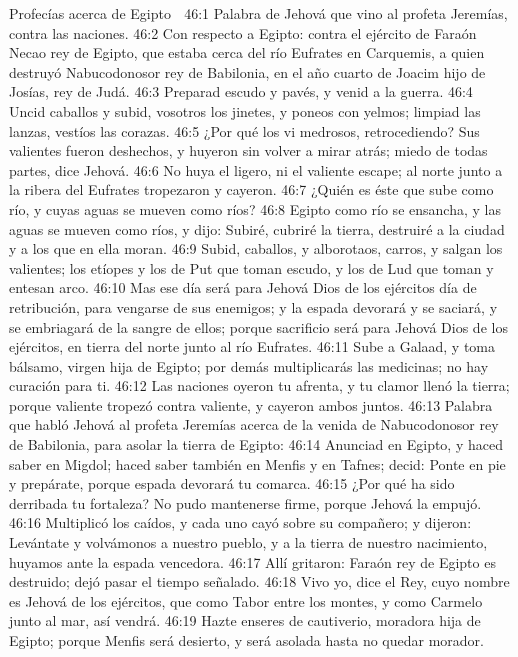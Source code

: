 Profecías acerca de Egipto 

46:1 Palabra de Jehová que vino al profeta Jeremías, contra las naciones.  
46:2 Con respecto a Egipto: contra el ejército de Faraón Necao rey de Egipto, que estaba cerca del río Eufrates en Carquemis, a quien destruyó Nabucodonosor rey de Babilonia, en el año cuarto de Joacim hijo de Josías, rey de Judá.  
46:3 Preparad escudo y pavés, y venid a la guerra.  
46:4 Uncid caballos y subid, vosotros los jinetes, y poneos con yelmos; limpiad las lanzas, vestíos las corazas.  
46:5 ¿Por qué los vi medrosos, retrocediendo? Sus valientes fueron deshechos, y huyeron sin volver a mirar atrás; miedo de todas partes, dice Jehová.  
46:6 No huya el ligero, ni el valiente escape; al norte junto a la ribera del Eufrates tropezaron y cayeron.  
46:7 ¿Quién es éste que sube como río, y cuyas aguas se mueven como ríos?  
46:8 Egipto como río se ensancha, y las aguas se mueven como ríos, y dijo: Subiré, cubriré la tierra, destruiré a la ciudad y a los que en ella moran.  
46:9 Subid, caballos, y alborotaos, carros, y salgan los valientes; los etíopes y los de Put que toman escudo, y los de Lud que toman y entesan arco.  
46:10 Mas ese día será para Jehová Dios de los ejércitos día de retribución, para vengarse de sus enemigos; y la espada devorará y se saciará, y se embriagará de la sangre de ellos; porque sacrificio será para Jehová Dios de los ejércitos, en tierra del norte junto al río Eufrates.  
46:11 Sube a Galaad, y toma bálsamo, virgen hija de Egipto; por demás multiplicarás las medicinas; no hay curación para ti.  
46:12 Las naciones oyeron tu afrenta, y tu clamor llenó la tierra; porque valiente tropezó contra valiente, y cayeron ambos juntos.  
46:13 Palabra que habló Jehová al profeta Jeremías acerca de la venida de Nabucodonosor rey de Babilonia, para asolar la tierra de Egipto: 
46:14 Anunciad en Egipto, y haced saber en Migdol; haced saber también en Menfis y en Tafnes; decid: Ponte en pie y prepárate, porque espada devorará tu comarca.  
46:15 ¿Por qué ha sido derribada tu fortaleza? No pudo mantenerse firme, porque Jehová la empujó.  
46:16 Multiplicó los caídos, y cada uno cayó sobre su compañero; y dijeron: Levántate y volvámonos a nuestro pueblo, y a la tierra de nuestro nacimiento, huyamos ante la espada vencedora.  
46:17 Allí gritaron: Faraón rey de Egipto es destruido; dejó pasar el tiempo señalado.  
46:18 Vivo yo, dice el Rey, cuyo nombre es Jehová de los ejércitos, que como Tabor entre los montes, y como Carmelo junto al mar, así vendrá.  
46:19 Hazte enseres de cautiverio, moradora hija de Egipto; porque Menfis será desierto, y será asolada hasta no quedar morador.  

